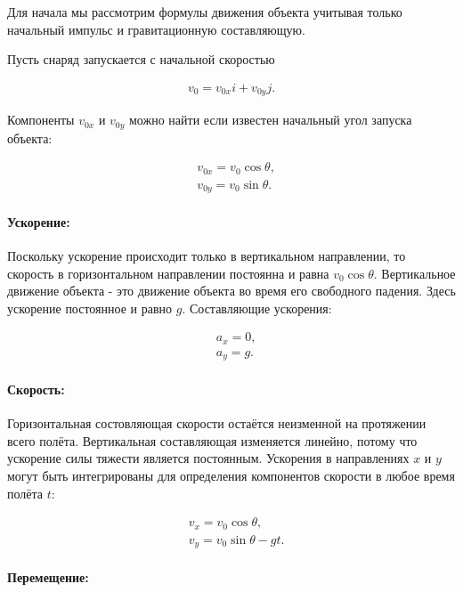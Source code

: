 Для начала мы рассмотрим формулы движения объекта учитывая только начальный импульс и гравитационную составляющую. 

Пусть снаряд запускается с начальной скоростью 

\begin{align}\label{math.start_velocity}
	v_0 = v_{0x} i + v_{0y} j.
\end{align}

Компоненты $v_{0x}$ и $v_{0y}$ можно найти если известен начальный угол запуска объекта:

\begin{align}
	& v_{0x} = v_0 \cos \theta, \label{math.start_velocity_x} \\
	& v_{0y} = v_0 \sin \theta. \label{math.start_velocity_y}
\end{align}

\paragraph{Ускорение:}

Поскольку ускорение происходит только в вертикальном направлении, то скорость в горизонтальном направлении постоянна и равна $ v_0 \cos \theta$. Вертикальное движение объекта - это движение объекта во время его свободного падения. Здесь ускорение постоянное и равно $g$. Составляющие ускорения:

\begin{align}
	& a_x = 0 , \label{math.acceleration_x} \\
	& a_y = g . \label{math.acceleration_y}
\end{align}

\paragraph{Скорость:}

Горизонтальная состовляющая скорости остаётся неизменной на протяжении всего полёта. Вертикальная составляющая изменяется линейно, потому что ускорение силы тяжести является постоянным. Ускорения в направлениях $x$ и $y$ могут быть интегрированы для определения компонентов скорости в любое время полёта $t$:

\begin{align}
	& v_x = v_0 \cos \theta , \label{math.velocity_x} \\
	& v_y = v_0 \sin \theta - gt . \label{math.velocity_y}
\end{align}

\paragraph{Перемещение:}

